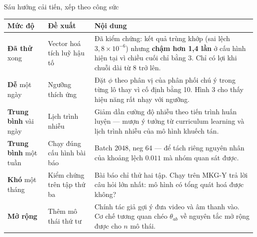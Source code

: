 \documentclass[aspectratio=169,10pt]{beamer}
\newcommand{\emphwarn}[1]{\textcolor{riskred}{\textbf{#1}}}
\newcommand{\muted}[1]{\textcolor{MutedTxt}{#1}}
\begin{document}
\begin{frame}{Sáu hướng cải tiến, xếp theo công sức}
{\scriptsize
\begin{tabular}{@{}p{2.2cm}p{4.0cm}p{6.4cm}@{}}
  \toprule
  Mức độ & Đề xuất & Nội dung\\
  \midrule
  \textcolor{MutedTxt}{\textbf{Đã thử}} \muted{xong}
    & Vector hoá tích luỹ hậu tố
    & Đã kiểm chứng: kết quả trùng khớp (sai lệch $3{,}8\!\times\!10^{-6}$) nhưng
      \emphwarn{chậm hơn 1,4 lần} ở cấu hình hiện tại vì chiều cuối chỉ bằng 3.
      Chỉ có lợi khi chuỗi dài từ 8 trở lên.\\
  \addlinespace[2pt]
  \textcolor{GoodGreen}{\textbf{Dễ}} \muted{một ngày}
    & Ngưỡng thích ứng
    & Đặt $\phi$ theo phân vị của phân phối chú ý trong từng lô thay vì cố định
      bằng 10. Hình 3 cho thấy hiệu năng rất nhạy với ngưỡng.\\
  \addlinespace[2pt]
  \textcolor{OrangeAc}{\textbf{Trung bình}} \muted{vài ngày}
    & Lịch trình nhiễu
    & Giảm dần cường độ nhiễu theo tiến trình huấn luyện --- mượn ý tưởng từ
      curriculum learning và lịch trình nhiễu của mô hình khuếch tán.\\
  \addlinespace[2pt]
  \textcolor{OrangeAc}{\textbf{Trung bình}} \muted{một tuần}
    & Chạy đúng cấu hình bài báo
    & Batch 2048, neg 64 --- để tách riêng nguyên nhân của khoảng lệch $0.011$
      mà nhóm quan sát được.\\
  \addlinespace[2pt]
  \textcolor{BadRed}{\textbf{Khó}} \muted{một tháng}
    & Kiểm chứng trên tập thứ ba
    & Bài báo chỉ thử hai tập. Chạy trên MKG-Y trả lời câu hỏi lớn nhất: mô hình
      có tổng quát hoá được không?\\
  \addlinespace[2pt]
  \textcolor{objectivepurple}{\textbf{Mở rộng}}
    & Thêm mô thái thứ tư
    & Chính tác giả gợi ý đưa video và âm thanh vào. Cơ chế tương quan chéo
      $\theta_{ab}$ về nguyên tắc mở rộng được cho $n$ mô thái.\\
  \bottomrule
\end{tabular}}
\end{frame}
\end{document}
